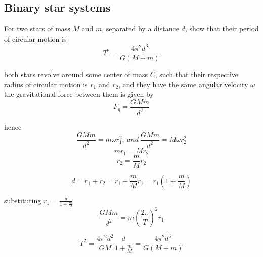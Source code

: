 \documentclass[a4paper, 10pt]{article}
\begin{document}
\subsection{Binary star systems}
For two stars of mass $M$ and $m$, separated by a distance $d$, show that their period of circular motion is \[
   T^2 = \frac{4\pi^2 d^3}{G(M+m)}
\]

both stars revolve around some center of mass $C$, such that their respective radius of circular motion is $r_1$ and $r_2$, and they have the same angular velocity $\omega$  \\

the gravitational force between them is given by 
\[
F_g = \frac{GMm}{d^2}
\]

hence 
\[
\frac{GMm}{d^2} = m \omega r_1^2,\ and\  \frac{GMm}{d^2} = M \omega r_2^2
\]
\[
mr_1 = Mr_2
\]
\[
r_2 = \frac{m}{M}r_2
\]

\[
   d = r_1 + r_2 = r_1 + \frac{m}{M}r_1 = r_1 \left( 1 + \frac{m}{M} \right)
\]

substituting $r_1 = \frac{d}{1 + \frac{m}{M}}$ 
\[
   \frac{GMm}{d^2} = m \left( \frac{2 \pi}{T}\right)^2 r_1
\]

\[
   T^2 = \frac{4\pi^2 d^2}{GM}\frac{d}{1 + \frac{m}{M}} = \frac{4\pi^2 d^3}{G(M+m)}
\]

 
 
\end{document}
